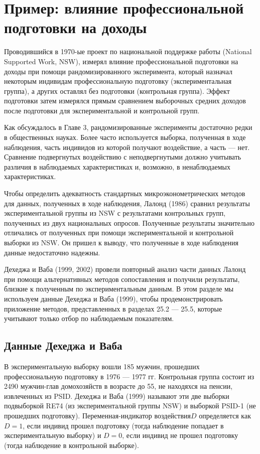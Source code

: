 \section{Пример: влияние профессиональной подготовки на доходы}

Проводившийся в 1970-ые проект по национальной поддержке работы (National Supported Work, NSW), измерял влияние профессиональной подготовки на доходы при помощи рандомизированного эксперимента, который назначал некоторым индивидам профессиональную подготовку (экспериментальная группа), а других оставлял без подготовки (контрольная группа). Эффект подготовки затем измерялся прямым сравнением выборочных средних доходов после подготовки для экспериментальной и контрольной групп. 

Как обсуждалось в Главе 3, рандомизированные эксперименты достаточно редки в общественных науках. Более часто используется выборка, полученная в ходе наблюдения, часть индивидов из которой получают воздействие, а часть --- нет. Сравнение подвергнутых воздействию с неподвергнутыми должно учитывать различия в наблюдаемых характеристиках и, возможно, в ненаблюдаемых характеристиках. 

Чтобы определить адекватность стандартных микроэконометрических методов для данных, полученных в ходе наблюдения, Лалонд (1986) сравнил результаты экспериментальной группы из NSW с результатами контрольных групп, полученных из двух национальных опросов. Полученные результаты значительно отличались от полученных при помощи экспериментальной и контрольной выборки из NSW. Он пришел к выводу, что полученные в ходе наблюдения данные недостаточно надежны. 

Дехеджа и Ваба (1999, 2002) провели повторный анализ части данных Лалонд при помощи альтернативных методов сопоставления и получили результаты, близкие к полученным по экспериментальным данным. В этом разделе мы используем данные Дехеджа и Ваба (1999), чтобы продемонстрировать приложение методов, представленных в разделах 25.2 --- 25.5, которые учитывают только отбор по наблюдаемым показателям. 

\subsection{Данные Дехеджа и Ваба}

В экспериментальную выборку вошли 185 мужчин, прошедших профессиональную подготовку в 1976 --- 1977 гг. Контрольная группа состоит из 2490 мужчин-глав домохозяйств в возрасте до 55, не находяхся на пенсии, извлеченных из PSID. Дехеджа и Ваба (1999) называют эти две выборки подвыборкой RE74 (из экспериментальной группы NSW) и выборкой PSID-1 (не прошедших подготовку). Переменная-индикатор воздействия$D$ определяется как $D = 1$, если индивид прошел подготовку (тогда наблюдение попадает в экспериментальную выборку) и $D = 0$, если индивид не прошел подготовку (тогда наблюдение в контрольной выборке). 

